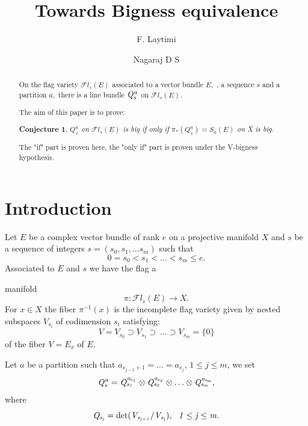 \documentclass[12pt]{amsart}
\author{F. Laytimi}
\author{Nagaraj D S}
\title{Towards  Bigness equivalence }
\newtheorem{conjecture}[subsection]{Conjecture}
\theoremstyle{definition}
\numberwithin{equation}{section}
\begin{document}
\date{}

\begin{abstract} 
	
	\bigskip
	On  the flag  variety $ \mathcal{F}l_s(E)$
	associated to a vector bundle $E,$ , a sequence $s$ and a partition $a,$ there is a line bundle $\it Q^a_s$  
        on $ \mathcal{F}l_s(E).$
        
The aim of this paper is to prove:

\begin{conjecture}   $Q^a_s $ on $ \mathcal{F}l_s(E)$ is big if only if $\pi_*(Q^a_s)=S_a(E)$ on X is big.
\end{conjecture}

The "if" part is proven here,  the "only if" part is proven under the V-bigness  hypothesis.


\end{abstract}

\maketitle

\section{Introduction} \setcounter{page}{1}
Let  $E$ be  a complex vector bundle  of rank $e$  on a projective manifold $X$
and $s$ be a sequence of integers $s=(s_0,s_1,\ldots s_m)$ such that  $$0=s_0<s_1<\ldots<s_m\leq e.$$
  Associated to $E$ and $s$ we have the flag  a
  
manifold  
$$ \pi : \mathcal{F}l_s(E) \to X. $$
For $x \in X$ the fiber $\pi^{-1}(x)$
is the incomplete flag variety given by nested subspaces $V_{s_i}$ of codimension $s_i$ satisfying:  
$$V=V_{s_0}\supset V_{s_1}\supset\ \ldots \supset V_{s_m}=\{0\}$$
of the 
fiber $V=E_x$ of $E.$




 Let  $a$  be a partition such that 
$a_{{s_{{j-1}}+1}}=\dots =a_{s_j}$,  $1\leq j\leq m$, we set 
$$ \it Q_s^a= \it Q^{a_{s_1}}_{s_1}\otimes \it Q^{a_{s_2}}_{s_2} \otimes \ldots \otimes \it Q^{a_{s_m}}_{s_m},$$ 
where $$ \it Q_{s_j}=\det(V_{s_{j-1}}/V_{s_{j}}), \ \ 1\leq j\leq m.$$ 

\bigskip
\end{document}
